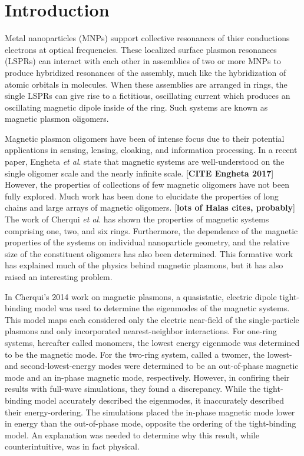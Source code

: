 \documentclass[journal=apchd5,manuscript=article]{achemso}
\begin{document}
\section{Introduction}
Metal nanoparticles (MNPs) support collective resonances of thier conductions electrons at optical frequencies. These localized surface plasmon resonances (LSPRs) can interact with each other in assemblies of two or more MNPs to produce hybridized resonances of the assembly, much like the hybridization of atomic orbitals in molecules. When these assemblies are arranged in rings, the single LSPRs can give rise to a fictitious, oscillating current which produces an oscillating magnetic dipole inside of the ring. Such systems are known as magnetic plasmon oligomers. 

Magnetic plasmon oligomers have been of intense focus due to their potential applications in sensing, lensing, cloaking, and information processing. In a recent paper, Engheta \textit{et al}. state that magnetic systems are well-understood on the single oligomer scale and the nearly infinite scale. [\textbf{CITE Engheta 2017}] However, the properties of collections of few magnetic oligomers have not been fully explored. Much work has been done to elucidate the properties of long chains and large arrays of magnetic oligomers. [\textbf{lots of Halas cites, probably}] The work of Cherqui \textit{et al}. has shown the properties of magnetic systems comprising one, two, and six rings. Furthermore, the dependence of the magnetic properties of the systems on individual nanoparticle geometry, and the relative size of the constituent oligomers has also been determined. This formative work has explained much of the physics behind magnetic plasmons, but it has also raised an interesting problem.

In Cherqui's 2014 work on magnetic plasmons, a quasistatic, electric dipole tight-binding model was used to determine the eigenmodes of the magnetic systems. This model maps each  considered only the electric near-field of the single-particle plasmons and only incorporated nearest-neighbor interactions. For one-ring systems, hereafter called monomers, the lowest energy eigenmode was determined to be the magnetic mode. For the two-ring system, called a twomer, the lowest- and second-lowest-energy modes were determined to be an out-of-phase magnetic mode and an in-phase magnetic mode, respectively. However, in confiring their results with full-wave simulations, they found a discrepancy. While the tight-binding model accurately described the eigenmodes, it inaccurately described their energy-ordering. The simulations placed the in-phase magnetic mode lower in energy than the out-of-phase mode, opposite the ordering of the tight-binding model. An explanation was needed to determine why this result, while counterintuitive, was in fact physical.
\end{document}

